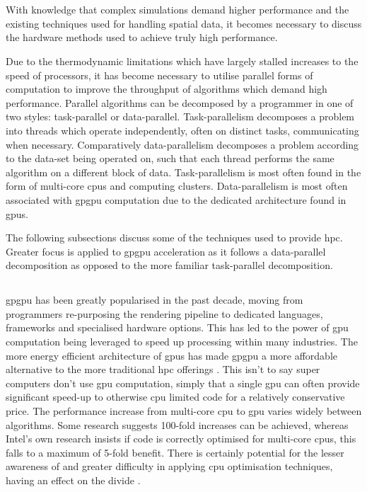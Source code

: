 \section{}
  With knowledge that complex simulations demand higher performance and the existing techniques used for handling spatial data, it becomes necessary to discuss the hardware methods used to achieve truly high performance.
  
  Due to the thermodynamic limitations which have largely stalled increases to the speed of processors, it has become necessary to utilise parallel forms of computation to improve the throughput of algorithms which demand high performance. Parallel algorithms can be decomposed by a programmer in one of two styles: task-parallel or data-parallel. Task-parallelism decomposes a problem into threads which operate independently, often on distinct tasks, communicating when necessary. Comparatively data-parallelism decomposes a problem according to the data-set being operated on, such that each thread performs the same algorithm on a different block of data. Task-parallelism is most often found in the form of multi-core \glspl{cpu} and computing clusters. Data-parallelism is most often associated with \gls{gpgpu} computation due to the dedicated architecture found in \glspl{gpu}.
    
  The following subsections discuss some of the techniques used to provide \gls{hpc}. Greater focus is applied to \gls{gpgpu} acceleration as it follows a data-parallel decomposition as opposed to the more familiar task-parallel decomposition.
  
  \subsection{\label{sec:gpgpu}}
    \gls{gpgpu} has been greatly popularised in the past decade, moving from programmers re-purposing the rendering pipeline to dedicated languages, frameworks and specialised hardware options. This has led to the power of \gls{gpu} computation being leveraged to speed up processing within many industries. The more energy efficient architecture of \glspl{gpu} has made \gls{gpgpu} a more affordable alternative to the more traditional \gls{hpc} offerings \cite{OH*08}. This isn't to say super computers don't use \gls{gpu} computation, simply that a single \gls{gpu} can often provide significant speed-up to otherwise \gls{cpu} limited code for a relatively conservative price. The performance increase from multi-core \gls{cpu} to \gls{gpu} varies widely between algorithms. Some research suggests 100-fold increases can be achieved, whereas Intel's own research insists if code is correctly optimised for multi-core \glspl{cpu}, this falls to a maximum of 5-fold benefit. There is certainly potential for the lesser awareness of and greater difficulty in applying \gls{cpu} optimisation techniques, having an effect on the divide \cite{LK*10}.

